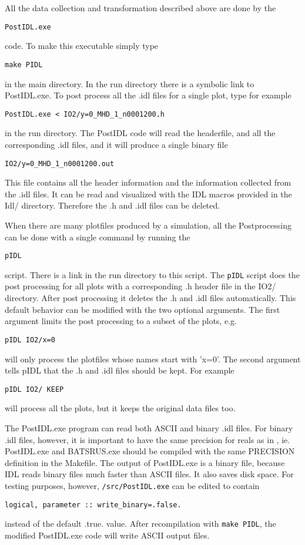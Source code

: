 All the data collection and transformation described above are done by the
\begin{verbatim}
PostIDL.exe
\end{verbatim}
code. To make this executable simply type 
\begin{verbatim}
make PIDL
\end{verbatim}
in the main directory. In the run directory there is a symbolic link
to PostIDL.exe. To post process all the .idl files for a single
plot, type for example
\begin{verbatim}
PostIDL.exe < IO2/y=0_MHD_1_n0001200.h
\end{verbatim}
in the run directory. The PostIDL code will read the headerfile, and
all the corresponding .idl files, and it will produce a single binary file
\begin{verbatim}
IO2/y=0_MHD_1_n0001200.out
\end{verbatim}
This file contains all the header information and the information collected
from the .idl files. It can be read and visualized with the IDL macros
provided in the Idl/ directory. Therefore the .h and .idl files can be
deleted.

When there are many plotfiles produced by a simulation, all the Postprocessing
can be done with a single command by running the
\begin{verbatim}
pIDL
\end{verbatim}
script. There is a link in the run directory to this script. The {\tt pIDL} 
script does the post processing for all plots with a corresponding
.h header file in the IO2/ directory. After post processing it deletes the
.h and .idl files automatically. This default behavior can be modified
with the two optional arguments. The first argument limits the post processing
to a subset of the plots, e.g.
\begin{verbatim}
pIDL IO2/x=0
\end{verbatim}
will only process the plotfiles whose names start with 'x=0'. The second
argument tells pIDL that the .h and .idl files should be kept. For example
\begin{verbatim}
pIDL IO2/ KEEP
\end{verbatim}
will process all the plots, but it keeps the original data files too.

The PostIDL.exe program can read both ASCII and binary .idl files. 
For binary .idl files, however, it is important to have the same
precision for reals as in \BATSRUS, ie. PostIDL.exe and BATSRUS.exe
should be compiled with the same PRECISION definition in the Makefile.
The output of PostIDL.exe is a binary file, because IDL reads
binary files much faster than ASCII files. It also saves disk space.
For testing purposes, however, {\tt /src/PostIDL.exe} can be edited to contain
\begin{verbatim}
logical, parameter :: write_binary=.false.
\end{verbatim}
instead of the default .true. value. After recompilation with {\tt make PIDL},
the modified PostIDL.exe code will write ASCII output files. 

